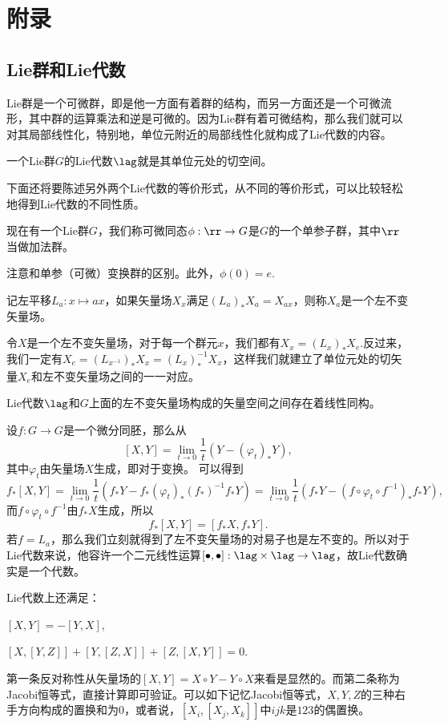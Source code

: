 \chapter{附录}
\section{Lie群和Lie代数}
Lie群是一个可微群，即是他一方面有着群的结构，而另一方面还是一个可微流形，其中群的运算乘法和逆是可微的。因为Lie群有着可微结构，那么我们就可以对其局部线性化，特别地，单位元附近的局部线性化就构成了Lie代数的内容。

\begin{defi}
一个Lie群$G$的Lie代数$\lag$就是其单位元处的切空间。
\end{defi}
下面还将要陈述另外两个Lie代数的等价形式，从不同的等价形式，可以比较轻松地得到Lie代数的不同性质。
\begin{defi}
现在有一个Lie群$G$，我们称可微同态$\phi:\rr\to G$是$G$的一个单参子群，其中$\rr$当做加法群。
\end{defi}
注意和单参（可微）变换群的区别。此外，$\phi(0)=e$.
\begin{defi}记左平移$L_a:x\mapsto ax$，如果矢量场$X_x$满足$(L_a)_*X_a=X_{ax}$，则称$X_a$是一个左不变矢量场。
\end{defi}
令$X$是一个左不变矢量场，对于每一个群元$x$，我们都有$X_x=(L_x)_*X_e$.反过来，我们一定有$X_e=(L_{x^{-1}})_*X_x=(L_x)^{-1}_*X_x$，这样我们就建立了单位元处的切矢量$X_e$和左不变矢量场之间的一一对应。
\begin{pro}
Lie代数$\lag$和$G$上面的左不变矢量场构成的矢量空间之间存在着线性同构。
\end{pro}

设$f:G\to G$是一个微分同胚，那么从
\[
	[X,Y]=\lim_{t\to 0}\frac{1}{t}\left(Y-(\varphi_t)_*Y\right),
\]
其中$\varphi_t$由矢量场$X$生成，即对于变换。
可以得到
\[
	f_*[X,Y]=\lim_{t\to 0}\frac{1}{t}\left(f_*Y-f_*(\varphi_t)_*(f_*)^{-1}f_*Y\right)=\lim_{t\to 0}\frac{1}{t}\left(f_*Y-(f\circ\varphi_t\circ f^{-1})_*f_*Y\right),
\]
而$f\circ\varphi_t\circ f^{-1}$由$f_*X$生成，所以
\[
	f_*[X,Y]=[f_*X,f_*Y].
\]
若$f=L_a$，那么我们立刻就得到了左不变矢量场的对易子也是左不变的。所以对于Lie代数来说，他容许一个二元线性运算$[\bullet,\bullet]:\lag\times \lag\to \lag$，故Lie代数确实是一个代数。
\begin{pro}
Lie代数上还满足：

 $[X,Y]=-[Y,X]$,

 $[X,[Y,Z]]+[Y,[Z,X]]+[Z,[X,Y]]=0$.
\end{pro}
第一条反对称性从矢量场的$[X,Y]=X\circ Y-Y\circ X$来看是显然的。而第二条称为Jacobi恒等式，直接计算即可验证。可以如下记忆Jacobi恒等式，$X,Y,Z$的三种右手方向构成的置换和为$0$，或者说，$[X_i,[X_j,X_k]]$中$ijk$是$123$的偶置换。

